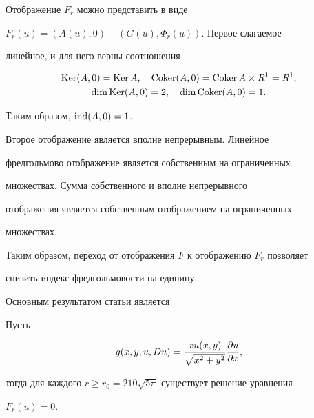 \begin{pf}


Отображение $F_r$ можно представить в виде


$F_r(u)=(A(u),0)+(G(u),\Phi_r(u))$. Первое слагаемое


линейное, и для него верны соотношения


\begin{gather*}


\Ker (A,0)=\Ker A, \quad \Coker (A,0)=\Coker A\times R^1=R^1,\\


\dim \Ker (A,0)=2, \quad\dim \Coker (A,0)=1.


\end{gather*}


Таким образом, $\operatorname{ind} (A,0)=1$.





Второе отображение является вполне непрерывным. Линейное


фредгольмово отображение является собственным на ограниченных


множествах. Сумма собственного и вполне непрерывного


отображения является собственным отображением на ограниченных


множествах.


\end{pf}





Таким образом, переход от отображения $F$ к отображению $F_r$ позволяет


снизить индекс фредгольмовости на единицу.





Основным результатом статьи является





\begin{thm}\label{main}


Пусть 


$$


g(x,y,u,Du)=\frac{xu(x,y)}{\sqrt{x^2+y^2}}\fr{u}{x},


$$


тогда для каждого $r\ge r_0=210\sqrt{5\pi }$ существует решение уравнения 


$F_r(u)=0$.


\end{thm} 





